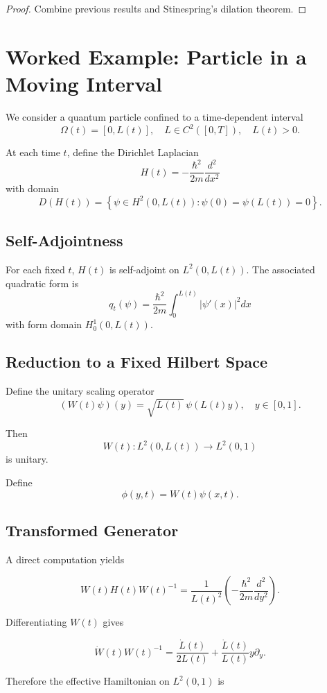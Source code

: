 \documentclass[11pt,a4paper]{article}
\begin{document}
\begin{proof}
Combine previous results and Stinespring's dilation theorem.
\end{proof}

\section{Worked Example: Particle in a Moving Interval}

We consider a quantum particle confined to a time-dependent interval
\[
\Omega(t) = [0,L(t)],
\quad L \in C^2([0,T]), \quad L(t) > 0.
\]

At each time $t$, define the Dirichlet Laplacian
\[
H(t) = -\frac{\hbar^2}{2m} \frac{d^2}{dx^2}
\]
with domain
\[
D(H(t))
=
\left\{
\psi \in H^2(0,L(t))
:
\psi(0)=\psi(L(t))=0
\right\}.
\]

\subsection{Self-Adjointness}

For each fixed $t$, $H(t)$ is self-adjoint on $L^2(0,L(t))$.
The associated quadratic form is
\[
q_t(\psi)
=
\frac{\hbar^2}{2m}
\int_0^{L(t)}
|\psi'(x)|^2 dx
\]
with form domain $H_0^1(0,L(t))$.

\subsection{Reduction to a Fixed Hilbert Space}

Define the unitary scaling operator
\[
(W(t)\psi)(y)
=
\sqrt{L(t)}\,\psi(L(t)y),
\quad y\in[0,1].
\]

Then
\[
W(t): L^2(0,L(t)) \to L^2(0,1)
\]
is unitary.

Define
\[
\phi(y,t)=W(t)\psi(x,t).
\]

\subsection{Transformed Generator}

A direct computation yields

\[
W(t) H(t) W(t)^{-1}
=
\frac{1}{L(t)^2}
\left(
-\frac{\hbar^2}{2m}\frac{d^2}{dy^2}
\right).
\]

Differentiating $W(t)$ gives

\[
\dot W(t) W(t)^{-1}
=
\frac{\dot L(t)}{2L(t)}
+
\frac{\dot L(t)}{L(t)} y \partial_y.
\]

Therefore the effective Hamiltonian on $L^2(0,1)$ is
\end{document}
